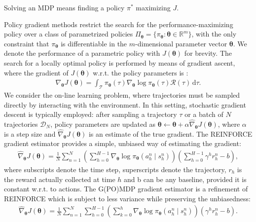 \documentclass{article}
\makeatletter
\theoremstyle{remark}
\theoremstyle{definition}
\DeclareRobustCommand{\wrt}{w.r.t.\@\xspace}
\newcommand{\realspace}{\mathbb R}      %
\newcommand{\de}{\,\mathrm{d}}
\newcommand{\vtheta}{\boldsymbol{\theta}}
\newcommand{\Tspace}{\mathcal{T}}
\newcommand{\Reward}{\mathcal{R}}
\newcommand{\pol}{\pi_{\vtheta}}
\newcommand{\score}[2]{\nabla_{#1}\log\pi_{#1}(#2)}
\newcommand{\gradJ}[1]{\nabla_{#1}J(\vtheta)}
\newcommand{\gradApp}[1]{\hat{\nabla}_{#1}J(\vtheta)}
\newcommand{\Dataset}{\mathcal{D}}
\makeatother
\begin{document}
Solving an MDP means finding a policy $\pi^*$ maximizing $J$.
\par
Policy gradient methods restrict the search for the performance-maximizing policy over a class of parametrized policies $\Pi_{\vtheta}=\{\pol : \vtheta \in \realspace^m\}$, with the only constraint that $\pol$ is differentiable in the $m$-dimensional parameter vector $\vtheta$. We denote the performance of a parametric policy with $J(\vtheta)$ for brevity. The search for a locally optimal policy is performed by means of gradient ascent, where the gradient of $J(\vtheta)$ \wrt the policy parameters is \cite{sutton2000policy}:
\begin{align*}
\gradJ{\vtheta} = \int_{\Tspace}\pol(\tau)\score{\vtheta}{\tau}\Reward(\tau)\de \tau.
\end{align*}
We consider the on-line learning problem, where trajectories must be sampled directly by interacting with the environment. In this setting, stochastic gradient descent is typically employed: after sampling a trajectory $\tau$ or a batch of $N$ trajectories $\Dataset_{N}$,
policy parameters are updated as $\vtheta\gets\vtheta + \alpha\gradApp{\vtheta}$, where $\alpha$ is a step size and $\gradApp{\vtheta}$ is an estimate of the true gradient. The REINFORCE gradient estimator \cite{williams1992simple} provides a simple, unbiased way of estimating the gradient:
\begin{align*}
\gradApp{\vtheta} = \frac{1}{N}\sum_{n=1}^{N}\left(\sum_{h=0}^{H-1}\score{\vtheta}{a_h^n\mid s_h^n}\right)\left(\sum_{h=0}^{H-1}\gamma^h r_h^n - b\right),
\end{align*}
where subscripts denote the time step, superscripts denote the trajectory, $r_h$ is the reward actually collected at time $h$ and b can be any baseline, provided it is constant \wrt to actions.
The G(PO)MDP gradient estimator \cite{baxter2001infinite} is a refinement of REINFORCE which is subject to less variance while preserving the unbiasedness:
\begin{align*}
\gradApp{\vtheta} = \frac{1}{N}\sum_{n=1}^{N}\sum_{h=0}^{H-1}\left(\sum_{k=0}^{h}\score{\vtheta}{a_h^n\mid s_h^n}\right)\left(\gamma^h r_h^n - b\right).
\end{align*}
\end{document}
